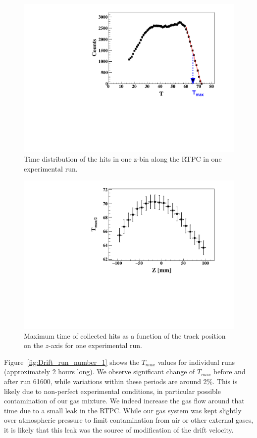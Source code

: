 \documentclass[preprint,5p]{elsarticle}
\begin{document}
\begin{figure}[t]
\centering
\includegraphics[scale=0.42]{hits_time_profile.pdf}
\caption{Time distribution of the hits in one z-bin along the RTPC in one 
experimental run. } \label{fig:TDC_profile}
\end{figure}

\begin{figure}[t]
\centering
\includegraphics[scale=0.42]{RunNumber_61452_TDCmax_Zslice.pdf}
\caption{Maximum time of collected hits as a function of the track
              position on the $z$-axis for one experimental run. } 
\label{fig:RunNumber_61551_TDCmax_Zslice}
\end{figure}

Figure~\ref{fig:Drift_run_number_1} shows the $T_{max}$ values for individual 
runs (approximately 2 hours long). We observe significant change of $T_{max}$
before and after run 61600, while variations within these periods are 
around 2\%. This is likely due to non-perfect experimental conditions, in 
particular possible contamination of our gas mixture. We indeed increase the gas flow 
around that time due to a small leak in the RTPC. While our 
gas system was kept slightly over atmospheric pressure to limit 
contamination from air or other external gases, it is likely that this leak was 
the source of modification of the drift velocity. 
\end{document}
